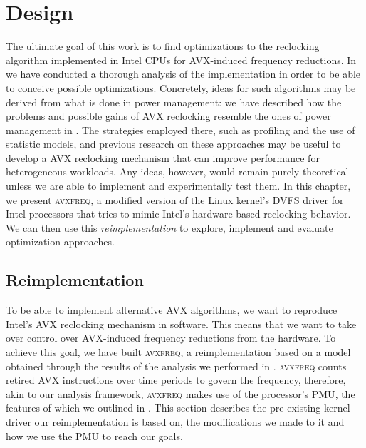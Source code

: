 \chapter{Design}
\label{sec:design}

The ultimate goal of this work is to find optimizations to the reclocking algorithm implemented in Intel \glspl{CPU} for \gls{AVX}-induced frequency reductions. In  we have conducted a thorough analysis of the implementation in order to be able to conceive possible optimizations. Concretely, ideas for such algorithms may be derived from what is done in power management: we have described how the problems and possible gains of \gls{AVX} reclocking resemble the ones of power management in . The strategies employed there, such as profiling and the use of statistic models, and previous research on these approaches may be useful to develop a \gls{AVX} reclocking mechanism that can improve performance for heterogeneous workloads. Any ideas, however, would remain purely theoretical unless we are able to implement and experimentally test them. In this chapter, we present \textsc{avxfreq}, a modified version of the Linux kernel's \gls{DVFS} driver for Intel processors that tries to mimic Intel's hardware-based reclocking behavior. We can then use this \emph{reimplementation} to explore, implement and evaluate optimization approaches.

\section{Reimplementation}
\label{sec:design:reimplementation}

To be able to implement alternative \gls{AVX} algorithms, we want to reproduce Intel's \gls{AVX} reclocking mechanism in software. This means that we want to take over control over \gls{AVX}-induced frequency reductions from the hardware. To achieve this goal, we have built \textsc{avxfreq}, a reimplementation based on a model obtained through the results of the analysis we performed in . \textsc{avxfreq} counts retired \gls{AVX} instructions over time periods to govern the frequency, therefore, akin to our analysis framework, \textsc{avxfreq} makes use of the processor's \gls{PMU}, the features of which we outlined in . This section describes the pre-existing kernel driver our reimplementation is based on, the modifications we made to it and how we use the \gls{PMU} to reach our goals.

